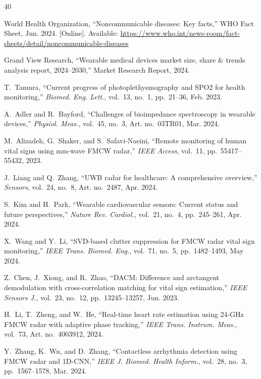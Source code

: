 \documentclass[journal,twoside]{IEEEtran}
\begin{document}
\begin{thebibliography}{40}

World Health Organization, ``Noncommunicable diseases: Key facts,'' WHO Fact Sheet, Jun. 2024. [Online]. Available: \url{https://www.who.int/news-room/fact-sheets/detail/noncommunicable-diseases}

Grand View Research, ``Wearable medical devices market size, share \& trends analysis report, 2024--2030,'' Market Research Report, 2024.

T.~Tamura, ``Current progress of photoplethysmography and SPO2 for health monitoring,'' \textit{Biomed. Eng. Lett.}, vol.~13, no.~1, pp.~21--36, Feb. 2023.

A.~Adler and R.~Bayford, ``Challenges of bioimpedance spectroscopy in wearable devices,'' \textit{Physiol. Meas.}, vol.~45, no.~3, Art. no.~03TR01, Mar. 2024.

M.~Alizadeh, G.~Shaker, and S.~Safavi-Naeini, ``Remote monitoring of human vital signs using mm-wave FMCW radar,'' \textit{IEEE Access}, vol.~11, pp.~55417--55432, 2023.

J.~Liang and Q.~Zhang, ``UWB radar for healthcare: A comprehensive overview,'' \textit{Sensors}, vol.~24, no.~8, Art. no.~2487, Apr. 2024.

S.~Kim and H.~Park, ``Wearable cardiovascular sensors: Current status and future perspectives,'' \textit{Nature Rev. Cardiol.}, vol.~21, no.~4, pp.~245--261, Apr. 2024.

X.~Wang and Y.~Li, ``SVD-based clutter suppression for FMCW radar vital sign monitoring,'' \textit{IEEE Trans. Biomed. Eng.}, vol.~71, no.~5, pp.~1482--1493, May 2024.

Z.~Chen, J.~Xiong, and R.~Zhao, ``DACM: Difference and arctangent demodulation with cross-correlation matching for vital sign estimation,'' \textit{IEEE Sensors J.}, vol.~23, no.~12, pp.~13245--13257, Jun. 2023.

H.~Li, T.~Zheng, and W.~He, ``Real-time heart rate estimation using 24-GHz FMCW radar with adaptive phase tracking,'' \textit{IEEE Trans. Instrum. Meas.}, vol.~73, Art. no.~4003912, 2024.

Y.~Zhang, K.~Wu, and D.~Zhang, ``Contactless arrhythmia detection using FMCW radar and 1D-CNN,'' \textit{IEEE J. Biomed. Health Inform.}, vol.~28, no.~3, pp.~1567--1578, Mar. 2024.


\end{thebibliography}
\end{document}
